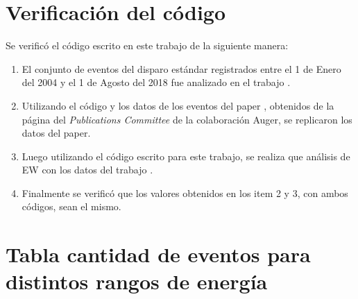 \section*{Verificación del código}
Se verificó el código escrito en este trabajo de la siguiente manera:

\begin{enumerate}[noitemsep]
    \item El conjunto de eventos del disparo estándar registrados entre el 1 de Enero del 2004 y el 1 de Agosto del 2018 fue analizado en el trabajo \cite{Aab_2020}.
    \item Utilizando el código y los datos de los eventos del paper \cite{Aab_2020}, obtenidos de la página del \emph{Publications Committee} de la colaboración Auger, se replicaron los datos del paper. 
    \item Luego utilizando el código escrito para este trabajo, se realiza que análisis de EW con los datos del trabajo \cite{Aab_2020}. 
    \item Finalmente se verificó que los valores obtenidos en los item 2 y 3, con  ambos códigos, sean el mismo.
\end{enumerate}


\section*{Tabla cantidad de eventos para distintos rangos de energía}

